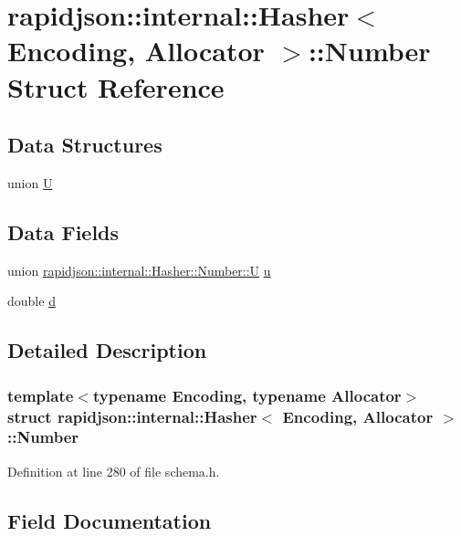 \hypertarget{structrapidjson_1_1internal_1_1_hasher_1_1_number}{}\section{rapidjson\+::internal\+::Hasher$<$ Encoding, Allocator $>$\+::Number Struct Reference}
\label{structrapidjson_1_1internal_1_1_hasher_1_1_number}
\subsection*{Data Structures}
\begin{DoxyCompactItemize}
\item 
union \mbox{\hyperlink{unionrapidjson_1_1internal_1_1_hasher_1_1_number_1_1_u}{U}}
\end{DoxyCompactItemize}
\subsection*{Data Fields}
\begin{DoxyCompactItemize}
\item 
union \mbox{\hyperlink{unionrapidjson_1_1internal_1_1_hasher_1_1_number_1_1_u}{rapidjson\+::internal\+::\+Hasher\+::\+Number\+::U}} \mbox{\hyperlink{structrapidjson_1_1internal_1_1_hasher_1_1_number_a3aaf6704e9fa85034397b7086ada509a}{u}}
\item 
double \mbox{\hyperlink{structrapidjson_1_1internal_1_1_hasher_1_1_number_ac30397bc3406adc60a323bd675d19194}{d}}
\end{DoxyCompactItemize}


\subsection{Detailed Description}
\subsubsection*{template$<$typename Encoding, typename Allocator$>$\newline
struct rapidjson\+::internal\+::\+Hasher$<$ Encoding, Allocator $>$\+::\+Number}



Definition at line 280 of file schema.\+h.



\subsection{Field Documentation}
\mbox{\label{structrapidjson_1_1internal_1_1_hasher_1_1_number_ac30397bc3406adc60a323bd675d19194}} 
